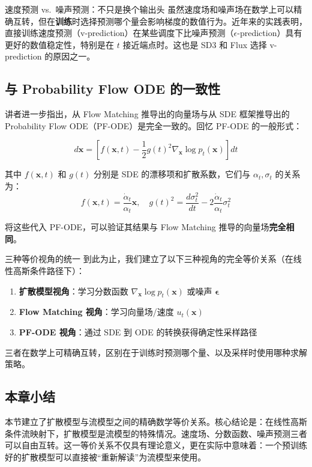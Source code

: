 \documentclass[a4paper]{article}
\begin{document}
\begin{warningbox}{速度预测 vs.\ 噪声预测：不只是换个输出头}
虽然速度场和噪声场在数学上可以精确互转，但在\textbf{训练}时选择预测哪个量会影响梯度的数值行为。近年来的实践表明，直接训练速度预测（v-prediction）在某些调度下比噪声预测（$\epsilon$-prediction）具有更好的数值稳定性，特别是在 $t$ 接近端点时。这也是 SD3 和 Flux 选择 v-prediction 的原因之一。
\end{warningbox}

\subsection{与 Probability Flow ODE 的一致性}

讲者进一步指出，从 Flow Matching 推导出的向量场与从 SDE 框架推导出的 Probability Flow ODE（PF-ODE）是完全一致的。回忆 PF-ODE 的一般形式：

$$d\mathbf{x} = \left[f(\mathbf{x}, t) - \frac{1}{2}g(t)^2 \nabla_\mathbf{x} \log p_t(\mathbf{x})\right] dt$$

其中 $f(\mathbf{x}, t)$ 和 $g(t)$ 分别是 SDE 的漂移项和扩散系数，它们与 $\alpha_t, \sigma_t$ 的关系为：
$$f(\mathbf{x}, t) = \frac{\dot{\alpha}_t}{\alpha_t} \mathbf{x}, \quad g(t)^2 = \frac{d\sigma_t^2}{dt} - 2\frac{\dot{\alpha}_t}{\alpha_t}\sigma_t^2$$

将这些代入 PF-ODE，可以验证其结果与 Flow Matching 推导的向量场\textbf{完全相同}。

\begin{importantbox}{三种等价视角的统一}
到此为止，我们建立了以下三种视角的完全等价关系（在线性高斯条件路径下）：
\begin{enumerate}
    \item \textbf{扩散模型视角}：学习分数函数 $\nabla_\mathbf{x} \log p_t(\mathbf{x})$ 或噪声 $\boldsymbol{\epsilon}$
    \item \textbf{Flow Matching 视角}：学习向量场/速度 $u_t(\mathbf{x})$
    \item \textbf{PF-ODE 视角}：通过 SDE 到 ODE 的转换获得确定性采样路径
\end{enumerate}
三者在数学上可精确互转，区别在于训练时预测哪个量、以及采样时使用哪种求解策略。
\end{importantbox}

\subsection{本章小结}

本节建立了扩散模型与流模型之间的精确数学等价关系。核心结论是：在线性高斯条件流映射下，扩散模型是流模型的特殊情况。速度场、分数函数、噪声预测三者可以自由互转。这一等价关系不仅具有理论意义，更在实际中意味着：一个预训练好的扩散模型可以直接被``重新解读''为流模型来使用。
\end{document}
